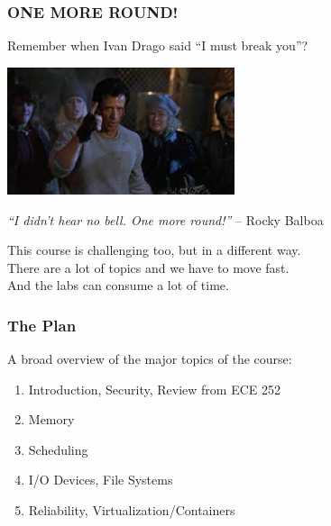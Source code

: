 \begin{frame}
\frametitle{ONE MORE ROUND!}

Remember when Ivan Drago said ``I must break you''? 

\begin{center}
	\includegraphics[width=0.5\textwidth]{images/one-more-round.jpg}
\end{center}
\hfill \textit{``I didn't hear no bell. One more round!''} -- Rocky Balboa

This course is challenging too, but in a different way.\\
\quad There are a lot of topics and we have to move fast.\\
\quad And the labs can consume a lot of time.

\end{frame}


\begin{frame}
\frametitle{The Plan}

A broad overview of the major topics of the course:

\begin{enumerate}
	\item Introduction, Security, Review from ECE 252
	\item Memory
	\item Scheduling
	\item I/O Devices, File Systems
	\item Reliability, Virtualization/Containers
\end{enumerate}

\end{frame}





